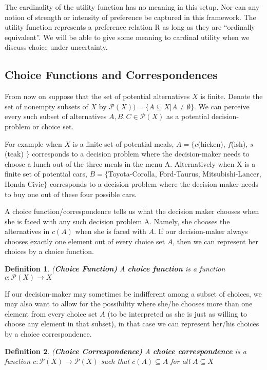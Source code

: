 \documentclass[12pt]{article}
\newtheorem{defin}{Definition}
\newcommand{\tn}[1]{\textnormal{#1}}
\newcommand{\pp}[1]{\mathcal{P}(#1)}
\newcommand{\name}[1]{\tn{(\textbf{#1)}}}
\newcommand{\es}{\emptyset}
\newcommand{\3}{\vspace*{3mm}}
\begin{document}
The cardinality of the utility function has no meaning in this setup. Nor can any notion of strength or intensity of preference be captured in this framework. The utility function represents a preference relation R as long as they are “ordinally equivalent”. We will be able to give some meaning to cardinal utility when we discuss choice under uncertainty.

\subsection{Choice Functions and Correspondences}

From now on suppose that the set of potential alternatives $X$ is finite. Denote the set of nonempty subsets of $X$ by $\pp{X)} = \{A \subseteq X | A \neq \es\}$. We can perceive every such subset of alternatives $A, B, C \in \pp{X}$ as a potential decision-problem or choice set. 

\quad For example when $X$ is a finite set of potential meals, $A = \{$\tn{$c$(hicken), $f$(ish), $s$(teak)} $\}$ corresponds to a decision problem where the decision-maker needs to choose a lunch out of the three meals in the menu A. Alternatively when X is a finite set of potential cars, $B =\{$Toyota-Corolla, Ford-Taurus, Mitsubishi-Lancer, Honda-Civic$\}$ corresponds to a decision problem where the decision-maker needs to buy one out of these four possible cars. 


\quad A choice function/correspondence tells us what the decision maker chooses when she is faced with any such decision problem A. Namely, she chooses the alternatives in $c(A)$ when she is faced with $A$. If our decision-maker always chooses exactly one element out of every choice set $A$, then we can represent her choices by a choice function.

\begin{defin} \name{Choice Function} \tn{A \textbf{choice function} is a function $c: \pp{X} \to X$}
\end{defin}

If our decision-maker may sometimes be indifferent among a subset of choices, we may also want to allow for the possibility where she/he chooses more than one element from every choice set $A$ (to be interpreted as she is just as willing to choose any element in that subset), in that case we can represent her/his choices by a choice correspondence. 

\begin{defin} \name{Choice Correspondence} 
\tn{A \textbf{choice correspondence} is a function $c: \pp{X} \to \pp{X}$ such that $c(A) \subseteq A$ for all $A \subseteq X$}
\end{defin}
\end{document}
